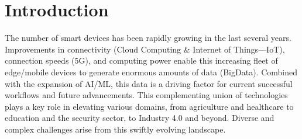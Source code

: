 \chapter{Introduction}

The number of smart devices has been rapidly growing in the last several years.
Improvements in connectivity (Cloud Computing \& Internet of Things—IoT), connection speeds (5G),
and computing power enable this increasing fleet of edge/mobile devices to generate enormous amounts of data (BigData).
Combined with the expansion of AI/ML, this data is a driving factor for current successful workflows and future advancements.
This complementing union of technologies plays a key role in elevating various domains,
from agriculture and healthcare to education and the security sector, to Industry 4.0 and beyond.
Diverse and complex challenges arise from this swiftly evolving landscape. \cite{paper:ai_edge_iot_review}





